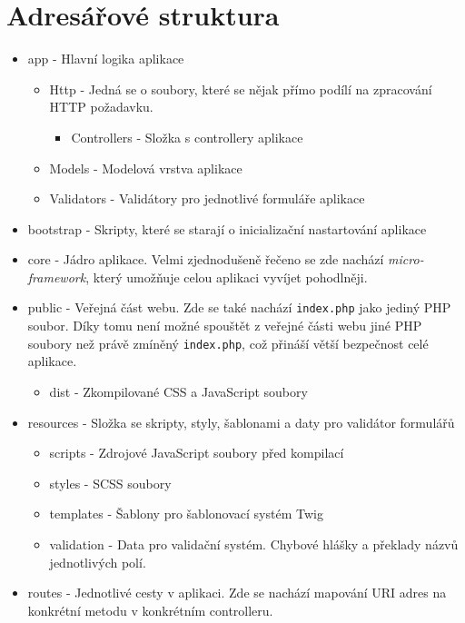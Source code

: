 \documentclass[12pt, a4paper]{article}
\begin{document}
    \section{Adresářové struktura}
    \begin{itemize}
    	\item app - Hlavní logika aplikace
    	\begin{itemize}
    		\item Http - Jedná se o soubory, které se nějak přímo podílí na zpracování HTTP požadavku.
    		\begin{itemize}
    			\item Controllers - Složka s controllery aplikace
     		\end{itemize}
     		\item Models - Modelová vrstva aplikace
     		\item Validators - Validátory pro jednotlivé formuláře aplikace
    	\end{itemize}
    	\item bootstrap - Skripty, které se starají o inicializační nastartování aplikace
    	\item core - Jádro aplikace. Velmi zjednodušeně řečeno se zde nachází {\it micro-framework}, který umožňuje celou aplikaci vyvíjet pohodlněji.
    	\item public - Veřejná část webu. Zde se také nachází {\tt index.php} jako jediný PHP soubor. Díky tomu není možné spouštět z veřejné části webu jiné PHP soubory než právě zmíněný {\tt index.php}, což přináší větší bezpečnost celé aplikace.
    	\begin{itemize}
    		\item dist - Zkompilované CSS a JavaScript soubory
    	\end{itemize}
    	\item resources - Složka se skripty, styly, šablonami a daty pro validátor formulářů
    	\begin{itemize}
    		\item scripts - Zdrojové JavaScript soubory před kompilací
    		\item styles - SCSS soubory
    		\item templates - Šablony pro šablonovací systém Twig
    		\item validation - Data pro validační systém. Chybové hlášky a překlady názvů jednotlivých polí.
    	\end{itemize}
    	\item routes - Jednotlivé cesty v aplikaci. Zde se nachází mapování URI adres na konkrétní metodu v konkrétním controlleru.

\end{itemize}
\end{document}
